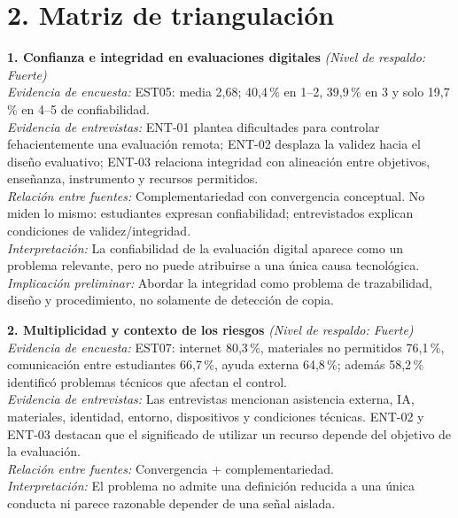 \section*{2. Matriz de triangulación}
\begin{center}\footnotesize
\begin{infobox}
\textbf{\textcolor{accent}{1. Confianza e integridad en evaluaciones digitales}} \textit{(Nivel de respaldo: Fuerte)}\\
\textit{Evidencia de encuesta:} EST05: media 2,68; 40,4\,\% en 1--2, 39,9\,\% en 3 y solo 19,7\,\% en 4--5 de confiabilidad.\\
\textit{Evidencia de entrevistas:} ENT-01 plantea dificultades para controlar fehacientemente una evaluación remota; ENT-02 desplaza la validez hacia el diseño evaluativo; ENT-03 relaciona integridad con alineación entre objetivos, enseñanza, instrumento y recursos permitidos.\\
\textit{Relación entre fuentes:} Complementariedad con convergencia conceptual. No miden lo mismo: estudiantes expresan confiabilidad; entrevistados explican condiciones de validez/integridad.\\
\textit{Interpretación:} La confiabilidad de la evaluación digital aparece como un problema relevante, pero no puede atribuirse a una única causa tecnológica.\\
\textit{Implicación preliminar:} Abordar la integridad como problema de trazabilidad, diseño y procedimiento, no solamente de detección de copia.
\end{infobox}
\vspace{2pt}
\begin{infobox}
\textbf{\textcolor{accent}{2. Multiplicidad y contexto de los riesgos}} \textit{(Nivel de respaldo: Fuerte)}\\
\textit{Evidencia de encuesta:} EST07: internet 80,3\,\%, materiales no permitidos 76,1\,\%, comunicación entre estudiantes 66,7\,\%, ayuda externa 64,8\,\%; además 58,2\,\% identificó problemas técnicos que afectan el control.\\
\textit{Evidencia de entrevistas:} Las entrevistas mencionan asistencia externa, IA, materiales, identidad, entorno, dispositivos y condiciones técnicas. ENT-02 y ENT-03 destacan que el significado de utilizar un recurso depende del objetivo de la evaluación.\\
\textit{Relación entre fuentes:} Convergencia + complementariedad.\\
\textit{Interpretación:} El problema no admite una definición reducida a una única conducta ni parece razonable depender de una señal aislada.\\

\end{infobox}
\end{center}
